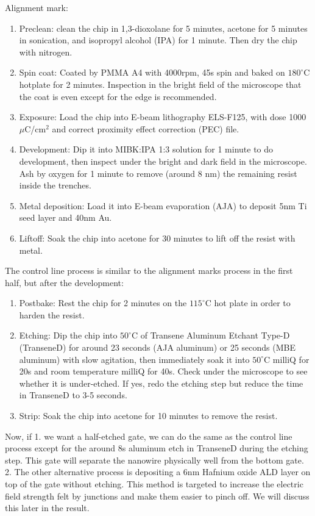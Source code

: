Alignment mark:
\begin{enumerate}
    \item Preclean: clean the chip in 1,3-dioxolane for 5 minutes, acetone for 5 minutes in sonication, and isopropyl alcohol (IPA) for 1 minute. Then dry the chip with nitrogen.
    \item Spin coat: Coated by PMMA A4 with 4000rpm, 45s spin and baked on $180^\circ$C hotplate for 2 minutes. Inspection in the bright field of the microscope that the coat is even except for the edge is recommended.
    \item Exposure: Load the chip into E-beam lithography ELS-F125, with dose 1000 $\mu$C/cm$^2$ and correct proximity effect correction (PEC) file.
    \item Development: Dip it into MIBK:IPA 1:3 solution for 1 minute to do development, then inspect under the bright and dark field in the microscope. Ash by oxygen for 1 minute to remove (around 8 nm) the remaining resist inside the trenches.
    \item Metal deposition: Load it into E-beam evaporation (AJA) to deposit 5nm Ti seed layer and 40nm Au.
    \item Liftoff: Soak the chip into acetone for 30 minutes to lift off the resist with metal. 
\end{enumerate}

The control line process is similar to the alignment marks process in the first half, but after the development:

\begin{enumerate}
    \item Postbake: Rest the chip for 2 minutes on the $115^\circ$C hot plate in order to harden the resist. 
    \item Etching: Dip the chip into $50^\circ$C of Transene Aluminum Etchant Type-D (TranseneD) for around 23 seconds (AJA aluminum) or 25 seconds (MBE aluminum) with slow agitation, then immediately soak it into $50^\circ$C milliQ for 20s and room temperature milliQ for 40s. Check under the microscope to see whether it is under-etched. If yes, redo the etching step but reduce the time in TranseneD to 3-5 seconds.
    \item Strip: Soak the chip into acetone for 10 minutes to remove the resist.
\end{enumerate}

Now, if 1. we want a half-etched gate, we can do the same as the control line process except for the around 8s aluminum etch in TranseneD during the etching step. This gate will separate the nanowire physically well from the bottom gate. 2. The other alternative process is depositing a 6nm Hafnium oxide ALD layer on top of the gate without etching. This method is targeted to increase the electric field strength felt by junctions and make them easier to pinch off. We will discuss this later in the result.

